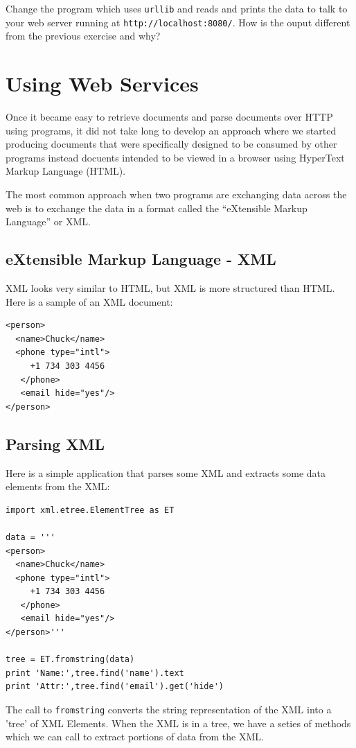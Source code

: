 \begin{ex}
Change the program which uses {\tt urllib} and reads and prints
the data to talk to your web server running at 
{\tt http://localhost:8080/}.
How is the ouput different from the previous exercise and why?
\end{ex}


\chapter{Using Web Services}

Once it became easy to retrieve documents and parse documents 
over HTTP using programs, it did not take long to develop 
an approach where we started producing documents that were specifically
designed to be consumed by other programs instead docuents
intended to be viewed in a browser using HyperText Markup Language
(HTML).

The most common approach when two programs are exchanging data across 
the web is to exchange the data in a format called the ``eXtensible Markup 
Language'' or XML.  

\section{eXtensible Markup Language - XML}

XML looks very similar to HTML, but XML is more structured 
than HTML.  Here is a sample of an XML document:

\beforeverb
\begin{verbatim}
<person>
  <name>Chuck</name>
  <phone type="intl">
     +1 734 303 4456
   </phone>
   <email hide="yes"/>
</person>
\end{verbatim}
\afterverb
%
\section{Parsing XML}

Here is a simple application that parses some XML
and extracts some data elements from the XML:

\beforeverb
\begin{verbatim}
import xml.etree.ElementTree as ET

data = '''
<person>
  <name>Chuck</name>
  <phone type="intl">
     +1 734 303 4456
   </phone>
   <email hide="yes"/>
</person>'''

tree = ET.fromstring(data)
print 'Name:',tree.find('name').text
print 'Attr:',tree.find('email').get('hide')
\end{verbatim}
\afterverb
%
The call to {\tt fromstring} converts the string representation
of the XML into a 'tree' of XML Elements.  When the
XML is in a tree, we have a seties of methods which we can call to 
extract portions of data from the XML.  

